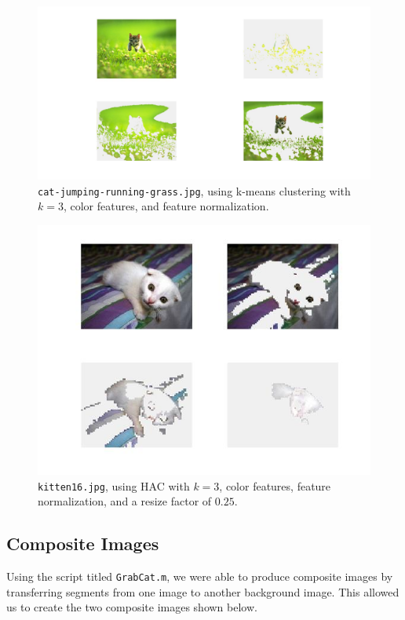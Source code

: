 \documentclass[12pt]{article}
\begin{document}
\begin{figure}[H]
	\centering
	\includegraphics[width=.95\textwidth]{unsucc2.jpg}
	\caption{\texttt{cat-jumping-running-grass.jpg}, using k-means clustering with $k = 3$, color features, and feature normalization.}
\end{figure}

\begin{figure}[H]
	\centering
	\includegraphics[width=.95\textwidth]{unsucc3.jpg}
	\caption{\texttt{kitten16.jpg}, using HAC with $k = 3$, color features, feature normalization, and a resize factor of $0.25$.}
\end{figure}

\subsection{Composite Images}
Using the script titled \texttt{GrabCat.m}, we were able to produce composite images by transferring segments from one image to another background image. This allowed us to create the two composite images shown below.
\end{document}
